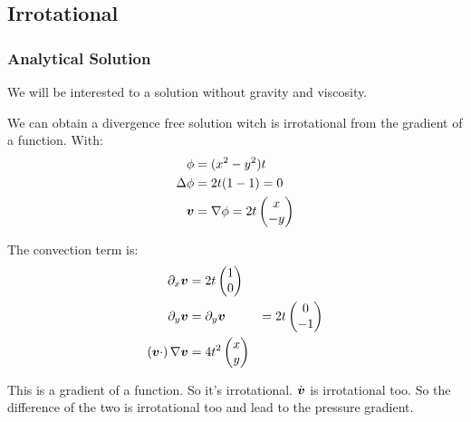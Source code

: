 \subsection{Irrotational}

\subsubsection{Analytical Solution}

We will be interested to a solution without gravity and viscosity.


We can obtain a divergence free solution witch is irrotational from the gradient of a function.
With:
\begin{align}
	\phi&=(x^2-y^2)t\\
	\Delta \phi &=2t(1-1)=0\\
	{\boldsymbol {v}}&=\nabla \phi=2t\begin{pmatrix}
	               	x\\
	               	-y
	               \end{pmatrix}
\end{align}

The convection term is:
\begin{align}
	\partial_{x}{\boldsymbol {v}}&=2t\begin{pmatrix}
	                        	1\\
	                        	0
	                        \end{pmatrix}\\
	\partial_{y}{\boldsymbol {v}}&=\partial_{y}{\boldsymbol {v}}&=2t\begin{pmatrix}
	                        	0\\
	                        	-1
	                        \end{pmatrix}\\
 \left({\boldsymbol {v}}\cdot\right) \nabla {\boldsymbol {v}}&=4t^2\begin{pmatrix}
                                                 	x\\
                                                 	y
                                                 \end{pmatrix}
\end{align}

This is a gradient of a function. So it's irrotational. $\dot{{\boldsymbol {v}}}$ is irrotational too.
So the difference of the two is irrotational too and lead to the pressure gradient.

